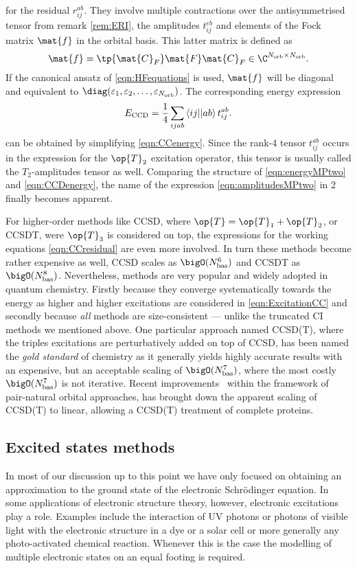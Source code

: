 for the \CCD residual $r_{ij}^{ab}$.
They involve multiple contractions over the
antisymmetrised \ERI tensor from remark \vref{rem:ERI},
the amplitudes $t_{ij}^{eb}$ and elements of the Fock matrix $\mat{f}$ in the \SCF orbital basis.
This latter matrix is defined as
\[ \mat{f} = \tp{\mat{C}_F} \mat{F} \mat{C}_F \in \C^{\Norb\times\Norb}.\]
If the canonical \HF ansatz of \eqref{eqn:HFequations} is used, $\mat{f}$ will be diagonal
and equivalent to $\diag(\varepsilon_1, \varepsilon_2, \ldots, \varepsilon_{\Norb})$.
The corresponding \CCD energy expression
\begin{equation}
	E_\text{CCD} = \frac14 \sum_{ijab} \left\langle ij \middle|\middle| ab \right\rangle t_{ij}^{ab}.
	\label{eqn:CCDenergy}
\end{equation}
can be obtained by simplifying \eqref{eqn:CCenergy}.
Since the rank-4 tensor $t_{ij}^{ab}$ occurs in the expression for the
$\op{T}_2$ excitation operator,
this tensor is usually called the $T_2$-amplitudes tensor as well.
Comparing the structure of \eqref{eqn:energyMPtwo} and \eqref{eqn:CCDenergy},
the name of the expression \eqref{eqn:amplitudesMPtwo} in {\MP}2 finally becomes apparent.

For higher-order methods like CCSD, where $\op{T} = \op{T}_1 + \op{T}_2$,
or CCSDT, were $\op{T}_3$ is considered on top,
the expressions for the working equations \eqref{eqn:CCresidual}
are even more involved.
In turn these methods become rather expensive as well,
\eg CCSD scales as $\bigO(\Nbas^6)$ and CCSDT as $\bigO(\Nbas^8)$.
Nevertheless, \CC methods are very popular and widely adopted in quantum chemistry.
Firstly because they converge systematically towards the \FCI energy
as higher and higher excitations are considered in \eqref{eqn:ExcitationCC}
and secondly because \emph{all} \CC methods are size-consistent
--- unlike the truncated CI methods we mentioned above.
One particular approach named CCSD(T),
where the triples excitations are perturbatively added on top of CCSD,
has been named the \emph{gold standard} of chemistry
as it generally yields highly accurate results with an expensive,
but an acceptable scaling of $\bigO(\Nbas^7)$,
where the most costly $\bigO(\Nbas^7)$ is not iterative.
Recent improvements~\cite{Riplinger2013} within the framework
of pair-natural orbital approaches,
has brought down the apparent scaling of CCSD(T) to linear,
allowing a CCSD(T) treatment of complete proteins.

\defineabbr{ADC}{ADC\xspace}{Algebraic-diagrammatic construction}
\subsection{Excited states methods}
\label{sec:ExcitedStates}
In most of our discussion up to this point we have only focused
on obtaining an approximation to the ground state of the electronic Schrödinger
equation.
In some applications of electronic structure theory, however,
electronic excitations play a role.
Examples include the interaction of UV photons or photons of visible light
with the electronic structure in a dye or a solar cell
or more generally any photo-activated chemical reaction.
Whenever this is the case the modelling of multiple electronic states on an equal footing
is required.

